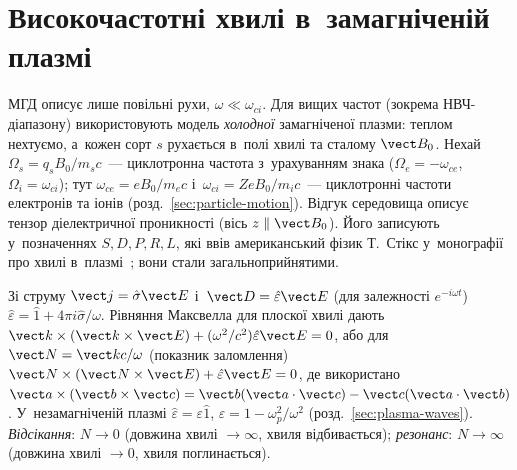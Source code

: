 \section{Високочастотні хвилі в~замагніченій плазмі}\label{sec:cold-magnetized}



МГД описує лише повільні рухи, $\omega\ll\omega_{ci}$. Для вищих частот (зокрема НВЧ-діапазону)
використовують модель \emph{холодної} замагніченої плазми: теплом нехтуємо, а~кожен
сорт $s$ рухається в~полі хвилі та сталому $\vect B_0$. Нехай $\Omega_s=q_sB_0/m_sc$~---
циклотронна частота з~урахуванням знака ($\Omega_e=-\omega_{ce}$, $\Omega_i=\omega_{ci}$); тут $\omega_{ce}=eB_0/m_ec$
і~$\omega_{ci}=ZeB_0/m_ic$~--- циклотронні частоти електронів та іонів (розд.~\ref{sec:particle-motion}). Відгук середовища
описує тензор діелектричної проникності (вісь $z\parallel\vect B_0$). Його записують у~позначеннях $S,D,P,R,L$,
які ввів американський фізик Т.~Стікс у~монографії про хвилі в~плазмі~\cite{stix1992waves}; вони стали загальноприйнятими.

\begin{Theory}
Зі струму $\vect j=\hat\sigma\vect E$ і~$\vect D=\hat\varepsilon\vect E$ (для залежності $e^{-i\omega t}$)
$\hat\varepsilon=\hat 1+4\pi i\hat\sigma/\omega$. Рівняння Максвелла для плоскої хвилі
дають $\vect k\times(\vect k\times\vect E)+(\omega^2/c^2)\hat\varepsilon\vect E=0$, або для
$\vect N=\vect kc/\omega$ (показник заломлення)
$\vect N\times(\vect N\times\vect E)+\hat\varepsilon\vect E=0$,
де використано $\vect a\times(\vect b\times\vect c)=\vect b(\vect a\cdot\vect c)-\vect c(\vect a\cdot\vect b)$.
У~незамагніченій плазмі $\hat\varepsilon=\varepsilon\hat1$, $\varepsilon=1-\omega_p^2/\omega^2$ (розд.~\ref{sec:plasma-waves}).
\emph{Відсікання}: $N\to0$ (довжина хвилі $\to\infty$, хвиля відбивається); \emph{резонанс}: $N\to\infty$
(довжина хвилі $\to0$, хвиля поглинається).
\end{Theory}

